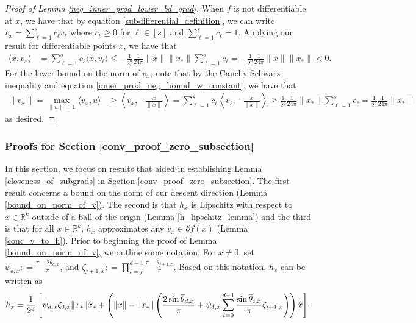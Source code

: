 \documentclass[11pt]{article}
\newcommand{\R}{\mathbb{R}}
\theoremstyle{remark}
\begin{document}
\begin{proof}[Proof of Lemma \ref{neg_inner_prod_lower_bd_grad}]
When $f$ is not differentiable at $x$, we have that by equation \eqref{subdifferential_definition}, we can write $v_x = \sum_{\ell=1}^{s}c_{\ell}v_{\ell}$ where $c_{\ell} \geqslant 0$ for $\ell \in [s]$ and $\sum_{\ell=1}^s c_{\ell} = 1$.  Applying our result for differentiable points $x$, we have that  \begin{align*}
     \langle x,v_x \rangle & = \sum_{\ell=1}^{s}c_{\ell}\langle x,v_{\ell}\rangle \leqslant - \frac{1}{2^d}\frac{1}{24\pi}\|x\|\|x_*\| \sum_{\ell=1}^{s}c_{\ell}  = - \frac{1}{2^d}\frac{1}{24\pi}\|x\|\|x_*\| < 0.
 \end{align*} For the lower bound on the norm of $v_x$, note that by the Cauchy-Schwarz inequality and equation \eqref{inner_prod_neg_bound_w_constant}, we have that \begin{align*}
     \|v_x\| = \max_{\|u\| = 1}\langle v_x,u\rangle & \geqslant \left\langle v_x, -\frac{x}{\|x\|} \right\rangle = \sum_{\ell=1}^s c_{\ell}\left\langle v_{\ell}, - \frac{x}{\|x\|}\right\rangle \geqslant \frac{1}{2^d}\frac{1}{24\pi}\|x_*\|\sum_{\ell=1}^s c_{\ell}  = \frac{1}{2^d}\frac{1}{24\pi}\|x_*\|
 \end{align*} as desired.
\end{proof}

\subsubsection{Proofs for Section \ref{conv_proof_zero_subsection}} \label{proofs_for_controlling_v_subsection}


In this section, we focus on results that aided in establishing Lemma \ref{closeness_of_subgrads} in Section \ref{conv_proof_zero_subsection}.  The first result concerns a bound on the norm of our descent direction (Lemma \ref{bound_on_norm_of_v}). The second is that $h_x$ is Lipschitz with respect to $x \in \R^k$ outside of a ball of the origin (Lemma \ref{h_lipschitz_lemma}) and the third is that for all $x \in \R^k$, $h_x$ approximates any $v_x \in \partial f(x)$ (Lemma \ref{conc_v_to_h}). Prior to beginning the proof of Lemma \ref{bound_on_norm_of_v}, we outline some notation. For $x \neq 0$, set $\psi_{d,x} : = \frac{\pi - 2\overline{\theta}_{d,x}}{\pi}$, and $\zeta_{j+1,x} : = \prod_{i=j}^{d-1}\frac{\pi - \overline{\theta}_{j+1,x}}{\pi}$.  Based on this notation, $h_x$ can be written as $$ h_x = \frac{1}{2^d}\left[\psi_{d,x}\zeta_{0,x} \|x_*\|\hat{x}_* + \left(\|x\|-\|x_*\|\left(\frac{2\sin \overline{\theta}_{d,x}}{\pi} + \psi_{d,x}\sum_{i=0}^{d-1}\frac{\sin \overline{\theta}_{i,x}}{\pi}\zeta_{i+1,x}\right)\right)\Hat{x}\right].$$
\end{document}
